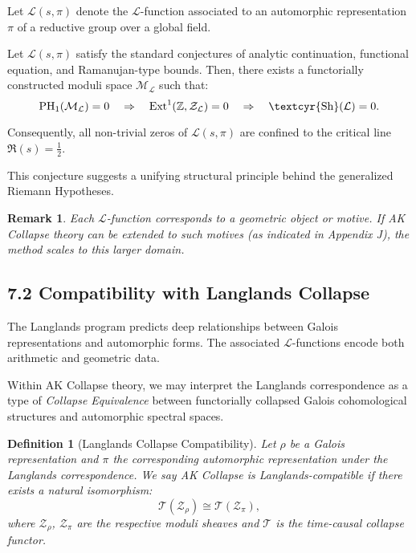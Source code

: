 \documentclass[11pt]{article}
\newtheorem{definition}[theorem]{Definition}
\newtheorem{remark}[theorem]{Remark}
\newcommand{\Sha}{\text{\textcyr{Sh}}}
\begin{document}
Let $\mathcal{L}(s, \pi)$ denote the $\mathcal{L}$-function associated to an automorphic representation $\pi$ of a reductive group over a global field.

\begin{conjecture}
Let $\mathcal{L}(s, \pi)$ satisfy the standard conjectures of analytic continuation, functional equation, and Ramanujan-type bounds.  
Then, there exists a functorially constructed moduli space $\mathcal{M}_{\mathcal{L}}$ such that:
\[
\mathrm{PH}_1(\mathcal{M}_{\mathcal{L}}) = 0 \quad \Rightarrow \quad \mathrm{Ext}^1(\mathbb{Z}, \mathcal{Z}_{\mathcal{L}}) = 0 \quad \Rightarrow \quad \Sha(\mathcal{L}) = 0.
\]

Consequently, all non-trivial zeros of $\mathcal{L}(s, \pi)$ are confined to the critical line $\Re(s) = \tfrac{1}{2}$.
\end{conjecture}

This conjecture suggests a unifying structural principle behind the generalized Riemann Hypotheses.

\begin{remark}
Each $\mathcal{L}$-function corresponds to a geometric object or motive.  
If AK Collapse theory can be extended to such motives (as indicated in Appendix J), the method scales to this larger domain.
\end{remark}

\subsection{7.2 Compatibility with Langlands Collapse}

The Langlands program predicts deep relationships between Galois representations and automorphic forms.  
The associated $\mathcal{L}$-functions encode both arithmetic and geometric data.

Within AK Collapse theory, we may interpret the Langlands correspondence as a type of \emph{Collapse Equivalence}  
between functorially collapsed Galois cohomological structures and automorphic spectral spaces.

\begin{definition}[Langlands Collapse Compatibility]
Let $\rho$ be a Galois representation and $\pi$ the corresponding automorphic representation under the Langlands correspondence.  
We say AK Collapse is Langlands-compatible if there exists a natural isomorphism:
\[
\mathcal{T}(\mathcal{Z}_\rho) \cong \mathcal{T}(\mathcal{Z}_\pi),
\]
where $\mathcal{Z}_\rho$, $\mathcal{Z}_\pi$ are the respective moduli sheaves and $\mathcal{T}$ is the time-causal collapse functor.
\end{definition}
\end{document}
